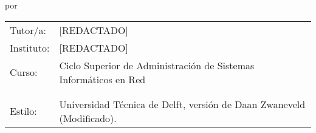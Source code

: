 \begin{titlepage}

\begin{center}

{\makeatletter
\largetitlestyle\fontsize{45}{45}\selectfont\@title
\makeatother}

{\makeatletter
\ifdefvoid{\@subtitle}{}{\bigskip\fontsize{20}{20}\selectfont\@subtitle}
\makeatother}

\bigskip
\bigskip

por

\bigskip
\bigskip

{\makeatletter
\largetitlestyle\fontsize{25}{25}\selectfont\@author
\makeatother}

\bigskip
\bigskip

\setlength\extrarowheight{2pt}


\vfill

\begin{tabular}{ll}
    Tutor/a: & [REDACTADO] \\
    Instituto: & [REDACTADO] \\
    Curso: & Ciclo Superior de Administración de Sistemas Informáticos en Red\\
    \bigskip \\
    \bigskip \\
    Estilo: & Universidad Técnica de Delft, versión de Daan Zwaneveld (Modificado). 
\end{tabular}

\end{center}


\end{titlepage}
